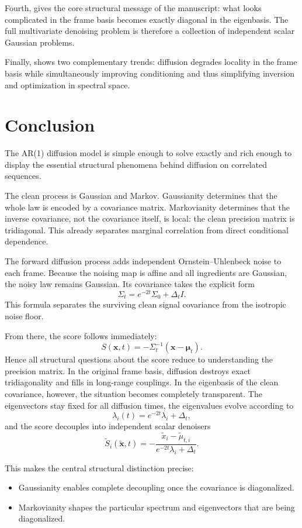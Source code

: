 \documentclass[11pt]{article}
\numberwithin{equation}{section}
\theoremstyle{definition}
\theoremstyle{remark}
\newcommand{\Id}{I}
\begin{document}
Fourth,  gives the core structural message of the manuscript: what looks complicated in the frame basis becomes exactly diagonal in the eigenbasis. The full multivariate denoising problem is therefore a collection of independent scalar Gaussian problems.

Finally,  shows two complementary trends: diffusion degrades locality in the frame basis while simultaneously improving conditioning and thus simplifying inversion and optimization in spectral space.

\section{Conclusion}

The AR(1) diffusion model is simple enough to solve exactly and rich enough to display the essential structural phenomena behind diffusion on correlated sequences.

The clean process is Gaussian and Markov. Gaussianity determines that the whole law is encoded by a covariance matrix. Markovianity determines that the inverse covariance, not the covariance itself, is local: the clean precision matrix is tridiagonal. This already separates marginal correlation from direct conditional dependence.

The forward diffusion process adds independent Ornstein--Uhlenbeck noise to each frame. Because the noising map is affine and all ingredients are Gaussian, the noisy law remains Gaussian. Its covariance takes the explicit form
\[
\Sigma_t=e^{-2t}\Sigma_0+\Delta_t\Id.
\]
This formula separates the surviving clean signal covariance from the isotropic noise floor.

From there, the score follows immediately:
\[
S(\mathbf x,t)=-\Sigma_t^{-1}(\mathbf x-\boldsymbol{\mu}_t).
\]
Hence all structural questions about the score reduce to understanding the precision matrix. In the original frame basis, diffusion destroys exact tridiagonality and fills in long-range couplings. In the eigenbasis of the clean covariance, however, the situation becomes completely transparent. The eigenvectors stay fixed for all diffusion times, the eigenvalues evolve according to
\[
\lambda_i(t)=e^{-2t}\lambda_i+\Delta_t,
\]
and the score decouples into independent scalar denoisers
\[
\widetilde S_i(\widetilde{\mathbf x},t)
=
-\frac{\widetilde x_i-\widetilde\mu_{t,i}}{e^{-2t}\lambda_i+\Delta_t}.
\]

This makes the central structural distinction precise:
\begin{itemize}[leftmargin=1cm]
\item Gaussianity enables complete decoupling once the covariance is diagonalized.
\item Markovianity shapes the particular spectrum and eigenvectors that are being diagonalized.
\end{itemize}
\end{document}
